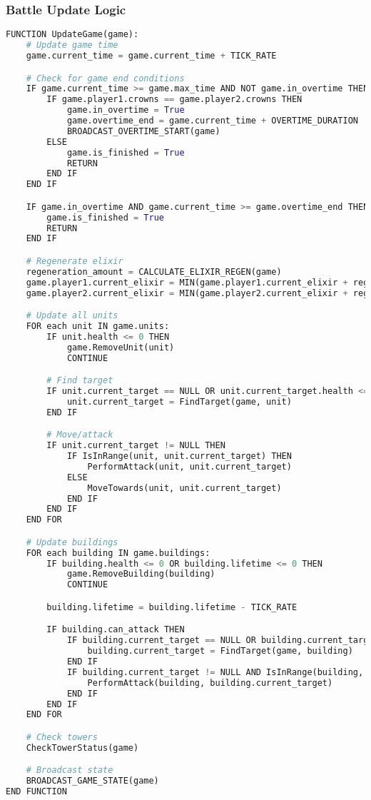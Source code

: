 \documentclass{article}
\begin{document}
\subsubsection{Battle Update Logic}
\begin{lstlisting}[language=Python, caption=Battle Update Logic]
FUNCTION UpdateGame(game):
    # Update game time
    game.current_time = game.current_time + TICK_RATE

    # Check for game end conditions
    IF game.current_time >= game.max_time AND NOT game.in_overtime THEN
        IF game.player1.crowns == game.player2.crowns THEN
            game.in_overtime = True
            game.overtime_end = game.current_time + OVERTIME_DURATION
            BROADCAST_OVERTIME_START(game)
        ELSE
            game.is_finished = True
            RETURN
        END IF
    END IF

    IF game.in_overtime AND game.current_time >= game.overtime_end THEN
        game.is_finished = True
        RETURN
    END IF

    # Regenerate elixir
    regeneration_amount = CALCULATE_ELIXIR_REGEN(game)
    game.player1.current_elixir = MIN(game.player1.current_elixir + regeneration_amount, MAX_ELIXIR)
    game.player2.current_elixir = MIN(game.player2.current_elixir + regeneration_amount, MAX_ELIXIR)

    # Update all units
    FOR each unit IN game.units:
        IF unit.health <= 0 THEN
            game.RemoveUnit(unit)
            CONTINUE

        # Find target
        IF unit.current_target == NULL OR unit.current_target.health <= 0 THEN
            unit.current_target = FindTarget(game, unit)
        END IF

        # Move/attack
        IF unit.current_target != NULL THEN
            IF IsInRange(unit, unit.current_target) THEN
                PerformAttack(unit, unit.current_target)
            ELSE
                MoveTowards(unit, unit.current_target)
            END IF
        END IF
    END FOR

    # Update buildings
    FOR each building IN game.buildings:
        IF building.health <= 0 OR building.lifetime <= 0 THEN
            game.RemoveBuilding(building)
            CONTINUE

        building.lifetime = building.lifetime - TICK_RATE

        IF building.can_attack THEN
            IF building.current_target == NULL OR building.current_target.health <= 0 THEN
                building.current_target = FindTarget(game, building)
            END IF
            IF building.current_target != NULL AND IsInRange(building, building.current_target) THEN
                PerformAttack(building, building.current_target)
            END IF
        END IF
    END FOR

    # Check towers
    CheckTowerStatus(game)

    # Broadcast state
    BROADCAST_GAME_STATE(game)
END FUNCTION
\end{lstlisting}
\end{document}

